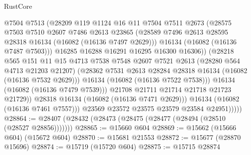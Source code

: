 \begin{lexlean}{RustCore}
\begin{coremodule}
                          @7504
                          @7513
                          (@28209
                            @119
                            @1124
                            @16
                            @11
                            @7504
                            @7511
                            @2673
                            (@28575
                              @7503
                              @7510
                              @2607
                              @7486
                              @2613
                              @23865
                              (@28589
                                @7496
                                @2613
                                @28595
                                @28318
                                @16134
                                (@16082 (@16136 @7497 @2629)))
                              @16134
                              (@16082 (@16136 @7487 @7503)))
                            @16285
                            @16288
                            @16291
                            @16295
                            @16300
                            @16306))
                        (@28218
                          @565
                          @151
                          @11
                          @15
                          @4713
                          @7538
                          @7548
                          @2607
                          @7521
                          @2613
                          (@28280 @564 @4713 @21203 @21207)
                          (@28362 @7531 @2613 @28284 @28318 @16134 (@16082 (@16136 @7532 @2629)))
                          @16134
                          (@16082 (@16136 @7522 @7538)))
                        @16134
                        (@16082 (@16136 @7479 @7539)))
                      @21708
                      @21711
                      @21714
                      @21718
                      @21723
                      @21729))
                  @28318
                  @16134
                  (@16082 (@16136 @7471 @2629)))
                @16134
                (@16082 (@16136 @7461 @7557)))
              @23569
              @23572
              @23575
              @23579
              @23584
              @24951)))))
@28864 := @28407 (@28432 (@28473 (@28475 (@28477 (@28494 (@28510 (@28527 @28856)))))))
@28865 := @15660 @604
@28869 := @15662 (@15666 @604) (@15672 @604)
@28870 := @15681 @21553
@28872 := @15677 (@28870 @15696)
@28874 := @15719 (@15720 @604)
@28875 := @15715 @28874

\end{coremodule}
\end{lexlean}
